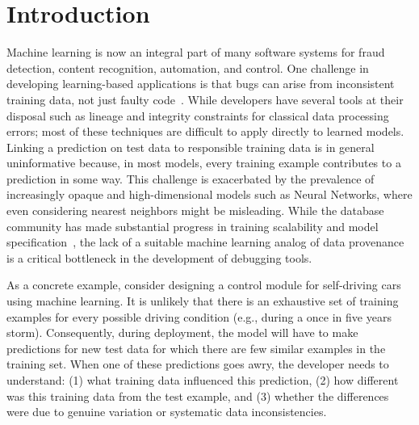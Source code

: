 \section{Introduction}\label{intro}
Machine learning is now an integral part of many software systems for fraud detection, content recognition, automation, and control.
One challenge in developing learning-based applications is that bugs can arise from inconsistent training data, not just faulty code~\cite{sculley2014machine, krishnan2016hilda}.
While developers have several tools at their disposal such as lineage and integrity constraints for classical data processing errors; most of these techniques are difficult to apply directly to learned models.
Linking a prediction on test data to responsible training data is in general uninformative because, in most models, every training example contributes to a prediction in some way.
This challenge is exacerbated by the prevalence of increasingly opaque and high-dimensional models such as Neural Networks, where even considering nearest neighbors might be misleading.
While the database community has made substantial progress in training scalability and model specification~\cite{hellerstein2012madlib,tensor, kraska2013mlbase, crotty2014tupleware, keystone}, the lack of a suitable machine learning analog of data provenance is a critical bottleneck in the development of debugging tools.

As a concrete example, consider designing a control module for self-driving cars using machine learning.
It is unlikely that there is an exhaustive set of training examples for every possible driving condition (e.g., during a once in five years storm).
Consequently, during deployment, the model will have to make predictions for new test data for which there are few similar examples in the training set.
When one of these predictions goes awry, the developer needs to understand: (1) what training data influenced this prediction, (2) how different was this training data from the test example, and (3) whether the differences were due to genuine variation or systematic data inconsistencies.  

